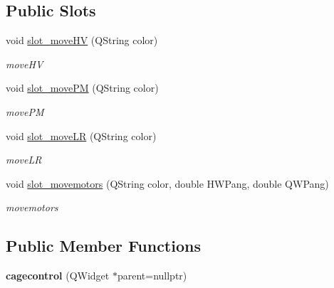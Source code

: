 \subsection*{Public Slots}
\begin{DoxyCompactItemize}
\item 
void \hyperlink{classcagecontrol_af9a2772a38394159c54d7e5d7f2a86fb}{slot\+\_\+move\+HV} (Q\+String color)
\begin{DoxyCompactList}\small\item\em move\+HV \end{DoxyCompactList}\item 
void \hyperlink{classcagecontrol_a3207f15cba9458e32fb5c2cf366c4b44}{slot\+\_\+move\+PM} (Q\+String color)
\begin{DoxyCompactList}\small\item\em move\+PM \end{DoxyCompactList}\item 
void \hyperlink{classcagecontrol_a138905383fdc09a0b5077a185eaf6682}{slot\+\_\+move\+LR} (Q\+String color)
\begin{DoxyCompactList}\small\item\em move\+LR \end{DoxyCompactList}\item 
void \hyperlink{classcagecontrol_a2d971435af3267351272b2c2d5f2f709}{slot\+\_\+movemotors} (Q\+String color, double H\+W\+Pang, double Q\+W\+Pang)
\begin{DoxyCompactList}\small\item\em movemotors \end{DoxyCompactList}\end{DoxyCompactItemize}
\subsection*{Public Member Functions}
\begin{DoxyCompactItemize}
\item 
\mbox{\label{classcagecontrol_a6630362ef3dd621859126e357e545dd5}} 
{\bfseries cagecontrol} (Q\+Widget $\ast$parent=nullptr)
\end{DoxyCompactItemize}
